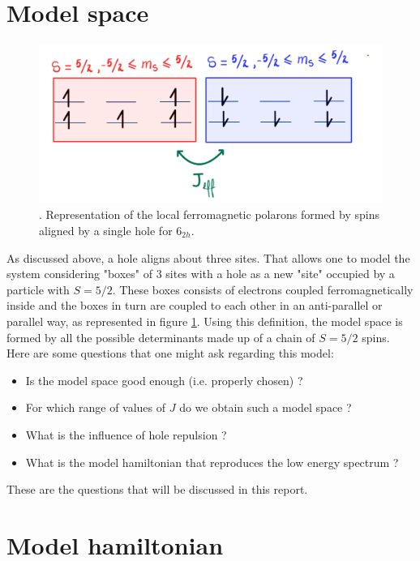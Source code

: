 \documentclass[12pt,twoside]{report}
\begin{document}
	\section{Model space}
	\begin{figure}[ht]
		\centering
			\includegraphics[scale=0.2]{boites.png}
		\caption{\label{boites}. Representation of the local ferromagnetic polarons formed by spins aligned by a single hole for 6$_{2h}$.}
	\end{figure}

	As discussed above, a hole aligns about three sites. That allows one to
	model the system considering "boxes" of 3 sites with a hole as a new "site"
	occupied by a particle with  $S=5 \slash 2$. These boxes consists of
	electrons coupled ferromagnetically inside and the boxes in turn are coupled
	to each other in an anti-parallel or parallel way, as represented in figure
	\ref{boites}.  Using this definition, the model space is formed by all the
	possible determinants made up of a chain of $S=5 \slash 2$ spins. Here are
	some questions that one might ask regarding this model:
	\begin{itemize}
	    \item Is the model space good enough (i.e. properly chosen) ?
	    \item For which range of values of $J$ do we obtain such a model space ?
	    \item What is the influence of hole repulsion ?
	    \item What is the model hamiltonian that reproduces the low energy spectrum ?
	\end{itemize}
	These are the questions that will be discussed in this report.
	
	
	\section{Model hamiltonian}
\end{document}
